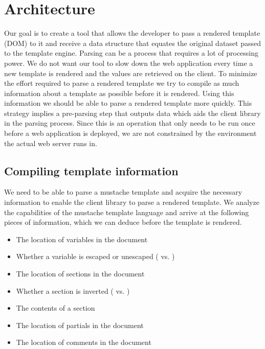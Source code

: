 \documentclass[thesis.tex]{subfiles}
\begin{document}
\chapter{Architecture}
\label{chap:architecture}

Our goal is to create a tool that allows the developer to pass a rendered
template (DOM) to it and receive a data structure that equates the original
dataset passed to the template engine.
Parsing can be a process that requires a lot of processing power. We do not want
our tool to slow down the web application every time a new template is rendered
and the values are retrieved on the client. To minimize the effort required to
parse a rendered template we try to compile as much information about a template
as possible before it is rendered. Using this information we should be able
to parse a rendered template more quickly.
This strategy implies a pre-parsing step that outputs data which aids
the client library in the parsing process. Since this is an operation
that only needs to be run once before a web application is deployed, we are not
constrained by the environment the actual web server runs in.

\section{Compiling template information}
\label{sec:arch-comp-tpl}
We need to be able to parse a mustache template and acquire the necessary
information to enable the client library to parse a rendered template.
We analyze the capabilities of the mustache template language and arrive
at the following pieces of information, which we can deduce before
the template is rendered.

\begin{itemize}
\item The location of variables in the document
\item Whether a variable is escaped or unescaped
      ( vs. )
\item The location of sections in the document
\item Whether a section is inverted
      ( vs. )
\item The contents of a section
\item The location of partials in the document
\item The location of comments in the document
\end{itemize}
\end{document}
